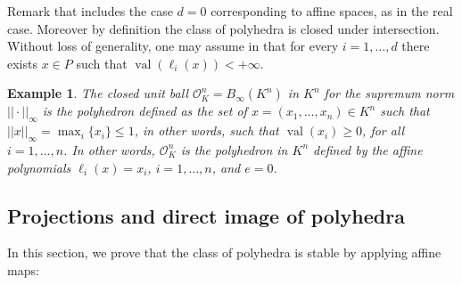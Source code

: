 \documentclass[a4paper,oneside,10pt]{article}
\newtheorem{example}[theorem]{Example}
\newcommand{\aff}[1]{{\text{aff}(#1)}} %
\newcommand{\relint}[1]{{\text{relint}(#1)}} %
\newcommand{\simone}[1]{{\color{blue} #1}} %
\DeclareMathOperator{\val}{val}
\newcommand{\OK}{\mathcal{O}_K}
\begin{document}
Remark that  includes the case $d=0$ corresponding to affine spaces, as in the real case.
Moreover by definition the class of polyhedra is closed under intersection. Without loss of generality, one may
assume in  that for every $i=1,\ldots,d$ there exists $x \in P$ such that
$\val(\ell_i(x))<+\infty$.

\begin{example}
  The \emph{closed unit ball} $\OK^n=B_\infty(K^n)$ in $K^n$ for the supremum norm $||\cdot||_{\infty}$ is the
  polyhedron defined as the set of $x=(x_1,\ldots,x_n) \in K^n$ such that $||x||_{\infty} =
  \max_i\{x_i\} \leq 1$, in other words, such that $\val(x_i) \geq 0$, for all $i=1, \ldots, n$.
  In other words, $\OK^n$ is the polyhedron in $K^n$ defined by the affine polynomials
  $\ell_i(x)=x_i$, $i=1,\ldots, n$, and $e=0$. %
\end{example}

\subsection{Projections and direct image of polyhedra}


In this section, we prove that the class of polyhedra is stable
by applying affine maps:
\end{document}
